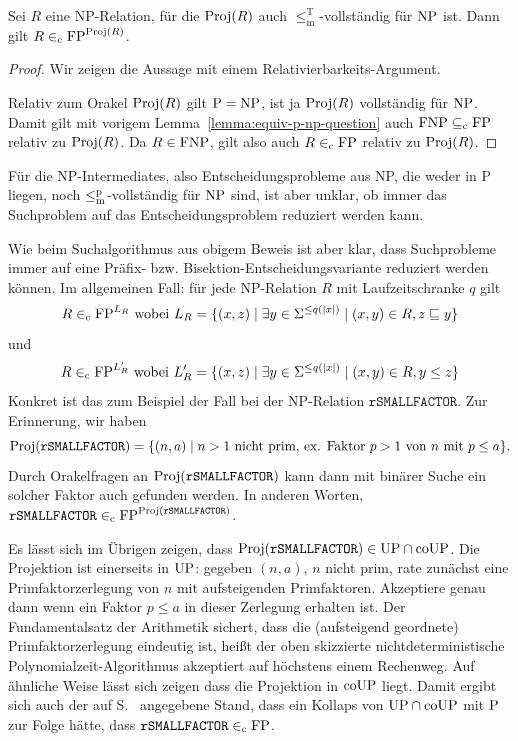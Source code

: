 \begin{corollary}\label{cor:search-to-decision}
    Sei $R$ eine NP-Relation, für die $\Proj(R)$ auch $\leq_\mathrm{m}^\mathrm{T}$-vollständig für $\NP$ ist.
    Dann gilt $R\inc \FP^{\Proj(R)}$.
\end{corollary}
\begin{proof}
    Wir zeigen die Aussage mit einem Relativierbarkeits-Argument.

    Relativ zum Orakel $\Proj(R)$ gilt $\P=\NP$, ist ja $\Proj(R)$ vollständig für $\NP$. Damit gilt mit vorigem Lemma~\ref{lemma:equiv-p-np-question} auch $\FNP \subseteqc \FP$ relativ zu $\Proj(R)$.
    Da $R\in \FNP$, gilt also auch $R\inc \FP$ relativ zu $\Proj(R)$.
\end{proof}

Für die NP-Intermediates, also Entscheidungsprobleme aus NP, die weder in P liegen, noch $\leqmp$-vollständig für $\NP$ sind, ist aber unklar, ob immer das Suchproblem auf das Entscheidungsproblem reduziert werden kann.

Wie beim Suchalgorithmus aus obigem Beweis ist aber klar, dass Suchprobleme immer auf eine Präfix- bzw. Bisektion-Entscheidungsvariante reduziert werden können.
Im allgemeinen Fall: für jede NP-Relation $R$ mit Laufzeitschranke $q$ gilt
\[ R \inc \FP^{L_R} \text{ wobei } L_R = \{ (x, z) \mid \exists y\in\Sigma^{\leq q(|x|)} \mid (x, y)\in R, z\sqsubseteq y \} \]
und 
\[ R \inc \FP^{L'_R} \text{ wobei } L'_R = \{ (x, z) \mid \exists y\in\Sigma^{\leq q(|x|)} \mid (x, y) \in R, y\leq z \} \]
Konkret ist das zum Beispiel der Fall bei der NP-Relation $\mathtt{rSMALLFACTOR}$. Zur Erinnerung, wir haben
\[ \Proj(\mathtt{rSMALLFACTOR}) = \{ (n,a)\mid \text{$n>1$ nicht prim, ex. Faktor $p>1$ von $n$ mit $p\leq a$} \}. \]
Durch Orakelfragen an $\Proj(\mathtt{rSMALLFACTOR})$ kann dann mit binärer Suche ein solcher Faktor auch gefunden werden.
In anderen Worten, $\mathtt{rSMALLFACTOR} \inc \FP^{\Proj(\mathtt{rSMALLFACTOR})}$.

Es lässt sich im Übrigen zeigen, dass $\Proj(\mathtt{rSMALLFACTOR})\in\UP\cap\coUP$.
Die Projektion ist einerseits in $\UP$: gegeben $(n, a)$, $n$ nicht prim, rate zunächst eine Primfaktorzerlegung von $n$ mit aufsteigenden Primfaktoren. Akzeptiere genau dann wenn ein Faktor $p\leq a$ in dieser Zerlegung erhalten ist. Der Fundamentalsatz der Arithmetik sichert, dass die (aufsteigend geordnete) Primfaktorzerlegung eindeutig ist, heißt der oben skizzierte nichtdeterministische Polynomialzeit-Algorithmus akzeptiert auf höchstens einem Rechenweg.
Auf ähnliche Weise lässt sich zeigen dass die Projektion in $\coUP$ liegt.
Damit ergibt sich auch der auf S.~\pageref{label:lösbarkeit} angegebene Stand, dass ein Kollaps von $\UP\cap\coUP$ mit $\P$ zur Folge hätte, dass $\mathtt{rSMALLFACTOR}\inc\FP$.

